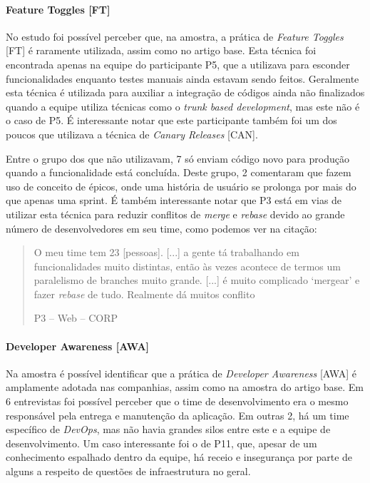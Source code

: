\paragraph{Feature Toggles [FT]}

No estudo foi possível perceber que, na amostra, a prática de \emph{Feature Toggles} [FT] é raramente utilizada, assim como no artigo base. Esta técnica foi encontrada apenas na equipe do participante P5, que a utilizava para esconder funcionalidades enquanto testes manuais ainda estavam sendo feitos. Geralmente esta técnica é utilizada para auxiliar a integração de códigos ainda não finalizados quando a equipe utiliza técnicas como o \emph{trunk based development}, mas este não é o caso de P5. É interessante notar que este participante também foi um dos poucos que utilizava a técnica de \emph{Canary Releases} [CAN].

Entre o grupo dos que não utilizavam, 7 só enviam código novo para produção quando a funcionalidade está concluída. Deste grupo, 2 comentaram que fazem uso de conceito de épicos, onde uma história de usuário se prolonga por mais do que apenas uma sprint. É também interessante notar que P3 está em vias de utilizar esta técnica para reduzir conflitos de \emph{merge} e \emph{rebase} devido ao grande número de desenvolvedores em seu time, como podemos ver na citação:

\blockquote[P3 -- Web -- CORP]{
    O meu time tem 23 [pessoas]. [...] a gente tá trabalhando em funcionalidades muito distintas, então às vezes acontece de termos um paralelismo de branches muito grande. [...] é muito complicado `mergear' e fazer \emph{rebase} de tudo. Realmente dá muitos conflito}


\paragraph{Developer Awareness [AWA]}

Na amostra é possível identificar que a prática de \emph{Developer Awareness} [AWA] é amplamente adotada nas companhias, assim como na amostra do artigo base. Em 6 entrevistas foi possível perceber que o time de desenvolvimento era o mesmo responsável pela entrega e manutenção da aplicação. Em outras 2, há um time específico de \emph{DevOps}, mas não havia grandes silos entre este e a equipe de desenvolvimento. Um caso interessante foi o de P11, que, apesar de um conhecimento espalhado dentro da equipe, há receio e insegurança por parte de alguns a respeito de questões de infraestrutura no geral.



